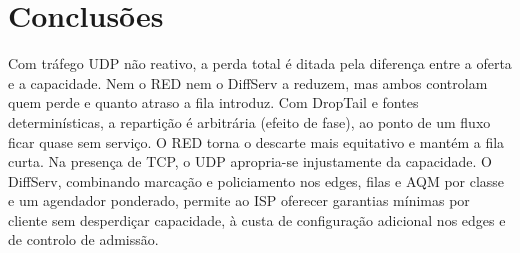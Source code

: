 \IfFileExists{llncs.cls}{\documentclass[runningheads]{llncs}}{\documentclass{article}}
\begin{document}
\section{Conclusões}
Com tráfego UDP não reativo, a perda total é ditada pela diferença entre a oferta e a
capacidade. Nem o RED nem o DiffServ a reduzem, mas ambos controlam quem perde e quanto
atraso a fila introduz. Com DropTail e fontes determinísticas, a repartição é arbitrária
(efeito de fase), ao ponto de um fluxo ficar quase sem serviço. O RED torna o descarte mais
equitativo e mantém a fila curta. Na
presença de TCP, o UDP apropria-se injustamente da capacidade. O DiffServ, combinando
marcação e policiamento nos edges, filas e AQM por classe e um agendador ponderado, permite
ao ISP oferecer garantias mínimas por cliente sem desperdiçar capacidade, à custa de
configuração adicional nos edges e de controlo de admissão.
\end{document}
